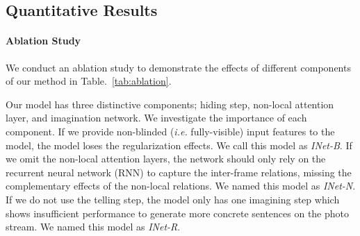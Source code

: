 \documentclass[letterpaper]{article} \usepackage{aaai20}  \usepackage{times}  \usepackage{helvet} \usepackage{courier}  \usepackage[hyphens]{url}  \usepackage{graphicx} \urlstyle{rm} \def\UrlFont{\rm}  \usepackage{graphicx}  \frenchspacing  \setlength{\pdfpagewidth}{8.5in}  \setlength{\pdfpageheight}{11in}
\newcommand{\tabref}[1]{Table.~\ref{#1}}
\newcommand{\ie}{{\it i.e. }}
\begin{document}
\begin{table}
\centering
{}
\caption{\textbf{Curriculum learning.} To show the effect of the curriculum learning, we experiment by varying the number of image dropouts for each item. The left column denotes the number of hidden input features during training. The (0, 1, 2) means that the number of hiding increases from 0 to 2. And the 0 denotes the number of hiding is fixed to 0.}
\label{tab:curriculum}
\end{table}


\subsection{Quantitative Results}
\paragraph{Ablation Study}
\quad

\noindent
We conduct an ablation study to demonstrate the effects of different components of our method in \tabref{tab:ablation}.

Our model has three distinctive components; hiding step, non-local attention layer, and imagination network.
We investigate the importance of each component. 
If we provide non-blinded (\ie fully-visible) input features to the model, the model loses the regularization effects. 
We call this model as \textit{INet-B}.
If we omit the non-local attention layers, the network should only rely on the recurrent neural network (RNN) to capture the inter-frame relations, missing the complementary effects of the non-local relations. 
We named this model as \textit{INet-N}. 
If we do not use the telling step, the model only has one imagining step which shows insufficient performance to generate more concrete sentences on the photo stream. 
We named this model as \textit{INet-R}.
\end{document}
